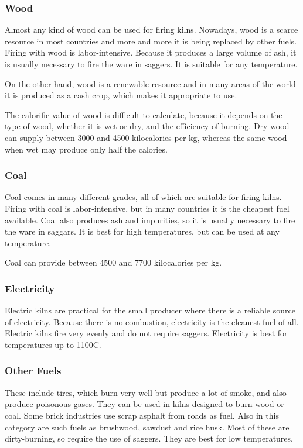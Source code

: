 \subsubsection{Wood}
Almost any kind of wood can be used for firing kilns. Nowadays, wood is a 
scarce resource in most countries and more and more it is being replaced by 
other fuels. Firing with wood is labor-intensive. Because it produces a large 
volume of ash, it is usually necessary to fire the ware in saggers. It is 
suitable for any temperature.

On the other hand, wood is a renewable resource and in many areas of the world 
it is produced as a cash crop, which makes it appropriate to use.

The calorific value of wood is difficult to calculate, because it depends on 
the type of wood, whether it is wet or dry, and the efficiency of burning. Dry 
wood can supply between 3000 and 4500 kilocalories per kg, whereas the same 
wood when wet may produce only half the calories.
\subsubsection{Coal}
Coal comes in many different grades, all of which are suitable for firing 
kilns. Firing with coal is labor-intensive, but in many countries it is the 
cheapest fuel available. Coal also produces ash and impurities, so it is 
usually necessary to fire the ware in saggars. It is best for high 
temperatures, but can be used at any temperature.

Coal can provide between 4500 and 7700 kilocalories per kg.
\subsubsection{Electricity}
Electric kilns are practical for the small producer where there is a reliable 
source of electricity. Because there is no combustion, electricity is the 
cleanest fuel of all. Electric kilns fire very evenly and do not require 
saggers. Electricity is best for temperatures up to 1100\degree C.
\subsubsection{Other Fuels}
These include tires, which burn very well but produce a lot of smoke, and also 
produce poisonous gases. They can be used in kilns designed to burn wood or 
coal. Some brick industries use scrap asphalt from roads as fuel. Also in this 
category are such fuels as brushwood, sawdust and rice husk. Most of these are 
dirty-burning, so require the use of saggers. They are best for low 
temperatures.
